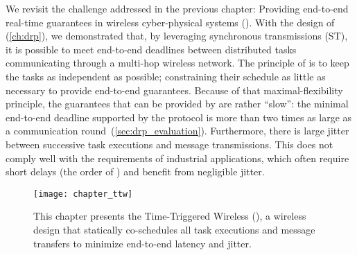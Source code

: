 

We revisit the challenge addressed in the previous chapter: Providing end-to-end real-time guarantees in wireless cyber-physical systems (\CPS).
With the design of \DRP (\cref{ch:drp}), we demonstrated that, by leveraging synchronous transmissions (ST), it is possible to meet end-to-end deadlines between distributed tasks communicating through a multi-hop wireless network.
The principle of \DRP is to keep the tasks as independent as possible; \ie constraining their schedule as little as necessary to provide end-to-end guarantees.
Because of that maximal-flexibility principle, the guarantees that can be provided by \DRP are rather ``slow'': the minimal end-to-end deadline supported by the protocol is more than two times as large as a communication round~(\cref{sec:drp_evaluation}).
Furthermore, there is large jitter between successive task executions and message transmissions.
This does not comply well with the requirements of industrial \CPS applications, which often require short delays (the order of \ms) and benefit from negligible jitter.

\begin{figure}
  \centering
  \texttt{[image: chapter\_ttw]}
  \caption{This chapter presents the Time-Triggered Wireless (\TTW), a wireless \CPS design that statically co-schedules all task executions and message transfers to minimize end-to-end latency and jitter.}
  \label{fig:chapter_ttw}
\end{figure}

\squarepar{%
  Thus, in this chapter we change the design objective: Instead of focusing on flexibility, we aim for minimizing latency and jitter in the system execution.

  \fakepar{Claim}
  We demonstrate for that end-to-end real-time guarantees can be obtained in low-power wireless networks by leveraging the efficiency and reliability of synchronous transmissions.
  In particular, this chapter presents Time-Triggered Wireless (\TTW), a design that statically co-schedules all task executions and message transfers to minimize end-to-end latency and jitter.%
}

